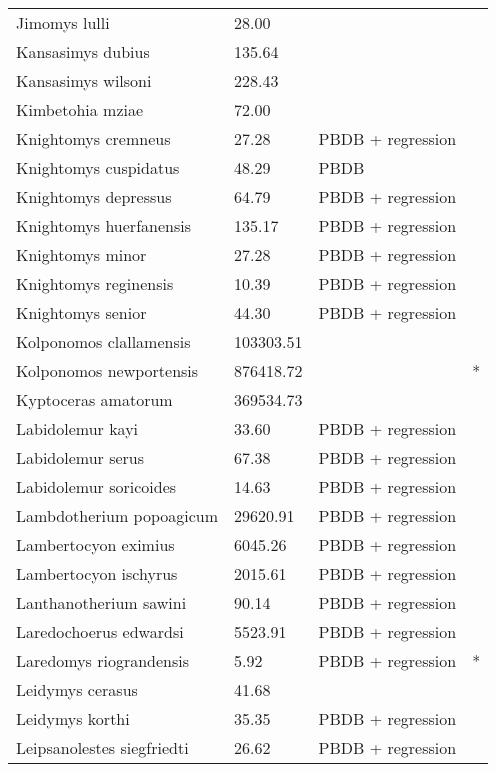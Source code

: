 \documentclass{article}
\begin{document}
\begin{center}
\begin{longtable}{p{} p{} p{} p{}}
    Jimomys lulli & 28.00 & \cite{McKenna2011} &  \\ 
    Kansasimys dubius & 135.64 & \cite{Tomiya2013} &  \\ 
    Kansasimys wilsoni & 228.43 & \cite{Matthew1901} &  \\ 
    Kimbetohia mziae & 72.00 & \cite{Wilson2012} &  \\ 
    Knightomys cremneus & 27.28 & PBDB + regression &  \\ 
    Knightomys cuspidatus & 48.29 & PBDB &  \\ 
    Knightomys depressus & 64.79 & PBDB + regression &  \\ 
    Knightomys huerfanensis & 135.17 & PBDB + regression &  \\ 
    Knightomys minor & 27.28 & PBDB + regression &  \\ 
    Knightomys reginensis & 10.39 & PBDB + regression &  \\ 
    Knightomys senior & 44.30 & PBDB + regression &  \\ 
    Kolponomos clallamensis & 103303.51 & \cite{Tseng2009} &  \\ 
    Kolponomos newportensis & 876418.72 & \cite{Scott2013} & * \\ 
    Kyptoceras amatorum & 369534.73 & \cite{Tomiya2013} &  \\ 
    Labidolemur kayi & 33.60 & PBDB + regression &  \\ 
    Labidolemur serus & 67.38 & PBDB + regression &  \\ 
    Labidolemur soricoides & 14.63 & PBDB + regression &  \\ 
    Lambdotherium popoagicum & 29620.91 & PBDB + regression &  \\ 
    Lambertocyon eximius & 6045.26 & PBDB + regression &  \\ 
    Lambertocyon ischyrus & 2015.61 & PBDB + regression &  \\ 
    Lanthanotherium sawini & 90.14 & PBDB + regression &  \\ 
    Laredochoerus edwardsi & 5523.91 & PBDB + regression &  \\ 
    Laredomys riograndensis & 5.92 & PBDB + regression & * \\ 
    Leidymys cerasus & 41.68 & \cite{Tomiya2013} &  \\ 
    Leidymys korthi & 35.35 & PBDB + regression &  \\ 
    Leipsanolestes siegfriedti & 26.62 & PBDB + regression &  \\ 

\end{longtable}
\end{center}
\end{document}
